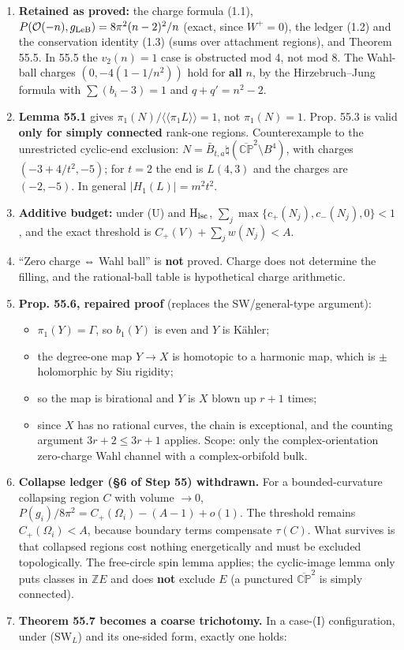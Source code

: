 \documentclass[
  10pt,
]{report}
\providecommand{\tightlist}{%
  \setlength{\itemsep}{0pt}\setlength{\parskip}{0pt}}
\renewcommand{\backslash}{\mathord{\text{\textbackslash}}}%
\renewcommand{\setminus}{\mathbin{\backslash}}}
\begin{document}
\begin{enumerate}
\def\labelenumi{\arabic{enumi}.}
\tightlist
\item
  \textbf{Retained as proved:} the charge formula (1.1),
  \(P(\mathcal O(-n),g_{\rm LeB})=8\pi^2(n-2)^2/n\) (exact, since
  \(W^+=0\)), the ledger (1.2) and the conservation identity (1.3) (sums
  over attachment regions), and Theorem 55.5. In 55.5 the \(v_2(n)=1\)
  case is obstructed mod 4, not mod 8. The Wahl-ball charges
  \((0,-4(1-1/n^2))\) hold for \textbf{all} \(n\), by the
  Hirzebruch--Jung formula with \(\sum(b_i-3)=1\) and \(q+q'=n^2-2\).
\item
  \textbf{Lemma 55.1} gives
  \(\pi_1(N)/\langle\!\langle\pi_1L\rangle\!\rangle=1\), not
  \(\pi_1(N)=1\). Prop. 55.3 is valid \textbf{only for simply connected}
  rank-one regions. Counterexample to the unrestricted cyclic-end
  exclusion:
  \(N=\bar B_{t,a}\natural(\overline{\mathbb{CP}}^2\setminus B^4)\),
  with charges \((-3+4/t^2,-5)\); for \(t=2\) the end is \(L(4,3)\) and
  the charges are \((-2,-5)\). In general \(|H_1(L)|=m^2t^2\).
\item
  \textbf{Additive budget:} under (U) and \(\mathrm H_{\rm lsc}\),
  \(\sum_j\max\{c_+(N_j),c_-(N_j),0\}<1\), and the exact threshold is
  \(C_+(V)+\sum_jw(N_j)<A\).
\item
  ``Zero charge ⇔ Wahl ball'' is \textbf{not} proved. Charge does not
  determine the filling, and the rational-ball table is hypothetical
  charge arithmetic.
\item
  \textbf{Prop. 55.6, repaired proof} (replaces the SW/general-type
  argument):

  \begin{itemize}
  \tightlist
  \item
    \(\pi_1(Y)=\Gamma\), so \(b_1(Y)\) is even and \(Y\) is Kähler;
  \item
    the degree-one map \(Y\to X\) is homotopic to a harmonic map, which
    is \(\pm\)holomorphic by Siu rigidity;
  \item
    so the map is birational and \(Y\) is \(X\) blown up \(r+1\) times;
  \item
    since \(X\) has no rational curves, the chain is exceptional, and
    the counting argument \(3r+2\le3r+1\) applies. Scope: only the
    complex-orientation zero-charge Wahl channel with a complex-orbifold
    bulk.
  \end{itemize}
\item
  \textbf{Collapse ledger (§6 of Step 55) withdrawn.} For a
  bounded-curvature collapsing region \(C\) with volume \(\to0\),
  \(P(g_i)/8\pi^2=C_+(\Omega_i)-(A-1)+o(1)\). The threshold remains
  \(C_+(\Omega_i)<A\), because boundary terms compensate \(\tau(C)\).
  What survives is that collapsed regions cost nothing energetically and
  must be excluded topologically. The free-circle spin lemma applies;
  the cyclic-image lemma only puts classes in \(\mathbb ZE\) and does
  \textbf{not} exclude \(E\) (a punctured \(\overline{\mathbb{CP}}^2\)
  is simply connected).
\item
  \textbf{Theorem 55.7 becomes a coarse trichotomy.} In a case-(I)
  configuration, under (SW\(_L\)) and its one-sided form, exactly one
  holds:


\end{enumerate}
\end{document}
